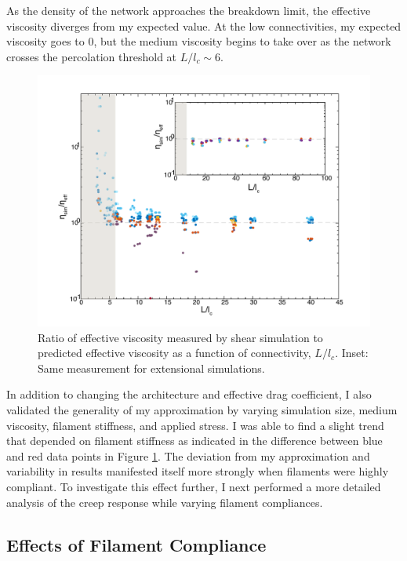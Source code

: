 As the density of the network approaches the breakdown limit, the effective viscosity diverges from my expected value.  At the low connectivities, my expected viscosity goes to 0, but the medium viscosity begins to take over as the network crosses the percolation threshold at $L/l_c \sim 6$.  
\begin{figure}[h!]
\centering
\includegraphics[width=\hsize]{slippage/eff_vic_master}
\caption[Ratio of effective viscosity measured by shear simulation to predicted effective viscosity.]{\label{fig:effvic}Ratio of effective viscosity measured by shear simulation to predicted effective viscosity as a function of connectivity, $L/l_c$. Inset: Same measurement for extensional simulations. }
\end{figure}

In addition to changing the architecture and effective drag coefficient, I also validated the generality of my approximation by varying simulation size, medium viscosity, filament stiffness, and applied stress.  I was able to find a slight trend that depended on filament stiffness as indicated in the difference between blue and red data points in Figure \ref{fig:effvic}.  The deviation from my approximation and variability in results manifested itself more strongly when filaments were highly compliant.  To investigate this effect further, I next performed a more detailed analysis of the creep response while varying filament compliances.



\subsection{Effects of Filament Compliance}
\label{sec:compliant}


